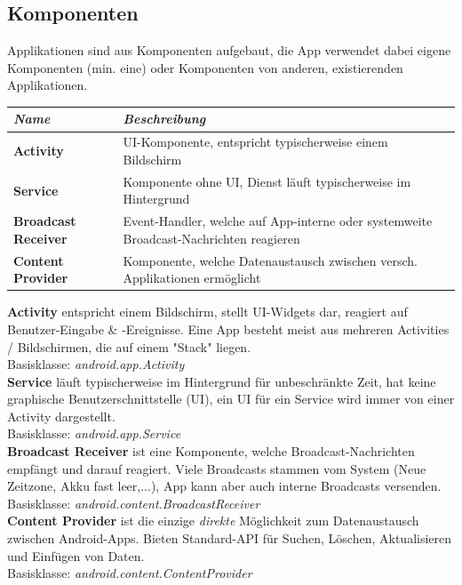 \documentclass[a4paper]{article}
\begin{document}
\subsection{Komponenten}
	Applikationen sind aus Komponenten aufgebaut, die App verwendet dabei eigene Komponenten (min. eine) oder Komponenten von anderen, existierenden Applikationen.
\begin{table}[h!]
	\begin{tabular}{ l | p{11cm} }
		\textbf{\textit{Name}}               & \textbf{\textit{Beschreibung}} \\
		\hline
		\textbf{Activity}           & UI-Komponente, entspricht typischerweise einem Bildschirm \\
		\textbf{Service}            & Komponente ohne UI, Dienst läuft typischerweise im Hintergrund \\
		\textbf{Broadcast Receiver} & Event-Handler, welche auf App-interne oder systemweite Broadcast-Nachrichten reagieren \\
		\textbf{Content Provider}   & Komponente, welche Datenaustausch zwischen versch. Applikationen ermöglicht
	\end{tabular}
\end{table}

\noindent
\textbf{Activity} entspricht einem Bildschirm, stellt UI-Widgets dar, reagiert auf Benutzer-Eingabe \& -Ereignisse. Eine App besteht meist aus mehreren Activities / Bildschirmen, die auf einem "Stack" liegen. \\
Basisklasse: \textit{android.app.Activity} \\
\textbf{Service} läuft typischerweise im Hintergrund für unbeschränkte Zeit, hat keine graphische Benutzer\-schnittstelle (UI), ein UI für ein Service wird immer von einer Activity dargestellt. \\
Basisklasse: \textit{android.app.Service} \\
\textbf{Broadcast Receiver} ist eine Komponente, welche Broadcast-Nachrichten empfängt und darauf reagiert. Viele Broadcasts stammen vom System (Neue Zeitzone, Akku fast leer,...), App kann aber auch interne Broadcasts versenden. \\
Basisklasse: \textit{android.content.BroadcastReceiver}\\
\textbf{Content Provider} ist die einzige \textit{direkte} Möglichkeit zum Datenaustausch zwischen Android-Apps. Bieten Standard-API für Suchen, Löschen, Aktualisieren und Einfügen von Daten. \\
Basisklasse: \textit{android.content.ContentProvider}
\newpage
\end{document}
